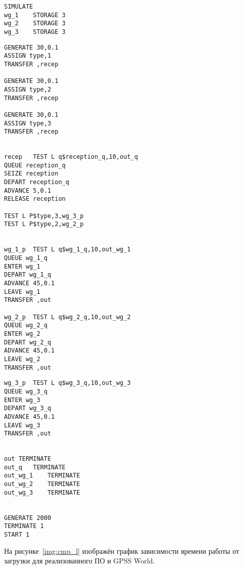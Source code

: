 \begin{center}
	\captionsetup{justification=raggedright,singlelinecheck=off}
	\begin{lstlisting}[label=lst:gpss,caption=Модель GPSS World,showstringspaces=false]
SIMULATE
wg_1	STORAGE 3
wg_2	STORAGE 3
wg_3	STORAGE 3
	\end{lstlisting}
\end{center}
\FloatBarrier

\begin{center}
	\captionsetup{justification=raggedright,singlelinecheck=off}
	\begin{lstlisting}[label=lst:gpss2,title=Продолжение листинга \ref{lst:gpss} ,showstringspaces=false,firstnumber=5]
GENERATE 30,0.1
ASSIGN type,1
TRANSFER ,recep

GENERATE 30,0.1
ASSIGN type,2
TRANSFER ,recep

GENERATE 30,0.1
ASSIGN type,3
TRANSFER ,recep


recep	TEST L q$reception_q,10,out_q
QUEUE reception_q
SEIZE reception
DEPART reception_q
ADVANCE 5,0.1
RELEASE reception

TEST L P$type,3,wg_3_p
TEST L P$type,2,wg_2_p


wg_1_p	TEST L q$wg_1_q,10,out_wg_1
QUEUE wg_1_q
ENTER wg_1
DEPART wg_1_q
ADVANCE 45,0.1
LEAVE wg_1
TRANSFER ,out

wg_2_p	TEST L q$wg_2_q,10,out_wg_2
QUEUE wg_2_q
ENTER wg_2
DEPART wg_2_q
ADVANCE 45,0.1
LEAVE wg_2
TRANSFER ,out
	\end{lstlisting}
\end{center}
\FloatBarrier

\begin{center}
	\captionsetup{justification=raggedright,singlelinecheck=off}
	\begin{lstlisting}[label=lst:gpss3,title=Продолжение листинга \ref{lst:gpss} ,showstringspaces=false,firstnumber=44]
wg_3_p	TEST L q$wg_3_q,10,out_wg_3
QUEUE wg_3_q
ENTER wg_3
DEPART wg_3_q
ADVANCE 45,0.1
LEAVE wg_3
TRANSFER ,out


out	TERMINATE
out_q	TERMINATE
out_wg_1	TERMINATE
out_wg_2	TERMINATE
out_wg_3	TERMINATE


GENERATE 2000
TERMINATE 1
START 1
	\end{lstlisting}
\end{center}
\FloatBarrier

На рисунке~\ref{img:cmp_l} изображён график зависимости времени работы от загрузки для реализованного ПО и GPSS World.

